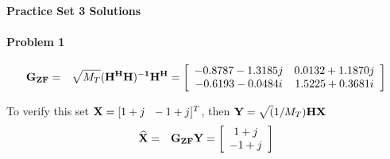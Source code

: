 \documentclass[12pt]{article}
\renewcommand{\hat}{\widehat}
\begin{document}
\begin{center}
\textbf{Practice Set 3 Solutions}
\end{center}
\paragraph{Problem 1}
\begin{eqnarray*}
{\bf G_{ZF}} &=& \sqrt{M_T}{\bf (H^HH)^{-1}H^H}=\left[
\begin{array}{cccc}
-0.8787 - 1.3185j &  0.0132 + 1.1870j \\
-0.6193 - 0.0484i & 1.5225 + 0.3681i
\end{array}
\right]
\end{eqnarray*}

To verify this set ${\bf X}=[1 + j~~-1 + j]^T$, then ${\bf Y}=\sqrt(1/M_T){\bf HX}$
\begin{eqnarray*}
\hat{{\bf X}} &=& {\bf G_{ZF}Y}=\left[\begin{array}{cccc}
1 + j  \\
-1 + j 
\end{array}
\right]
\end{eqnarray*}
\end{document}
